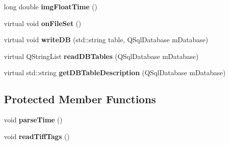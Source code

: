 \begin{DoxyCompactItemize}
\item 
long double {\bfseries img\+Float\+Time} ()\hypertarget{classImage_a26cd3cc2ba62c392421258788a2359e0}{}\label{classImage_a26cd3cc2ba62c392421258788a2359e0}

\item 
virtual void {\bfseries on\+File\+Set} ()\hypertarget{classImage_aac15594555d7479747ae0730444f89f2}{}\label{classImage_aac15594555d7479747ae0730444f89f2}

\item 
virtual void {\bfseries write\+DB} (std\+::string table, Q\+Sql\+Database m\+Database)\hypertarget{classImage_a2bc415e23666a6f85557cd270bcacae0}{}\label{classImage_a2bc415e23666a6f85557cd270bcacae0}

\item 
virtual Q\+String\+List {\bfseries read\+D\+B\+Tables} (Q\+Sql\+Database m\+Database)\hypertarget{classImage_a208498504b7aef66f5671596c3b99601}{}\label{classImage_a208498504b7aef66f5671596c3b99601}

\item 
virtual std\+::string {\bfseries get\+D\+B\+Table\+Description} (Q\+Sql\+Database m\+Database)\hypertarget{classImage_a4de05a161fa65cefbdc9a50f406c45a7}{}\label{classImage_a4de05a161fa65cefbdc9a50f406c45a7}

\end{DoxyCompactItemize}
\subsection*{Protected Member Functions}
\begin{DoxyCompactItemize}
\item 
void {\bfseries parse\+Time} ()\hypertarget{classImage_adf09c3545b003199640276db553efc30}{}\label{classImage_adf09c3545b003199640276db553efc30}

\item 
void {\bfseries read\+Tiff\+Tags} ()\hypertarget{classImage_a8b17b83fee9978e7595b491a53a50445}{}\label{classImage_a8b17b83fee9978e7595b491a53a50445}

\end{DoxyCompactItemize}
